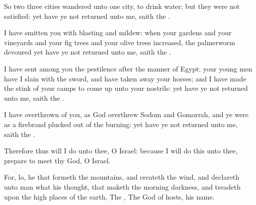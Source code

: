 {So
two
{}
three
cities
wandered unto
one
city, to
drink
water; but they were not
satisfied: yet have ye not
returned unto me,
saith the
{}.

I have
smitten you with
blasting and
mildew: when your
gardens and your
vineyards and your fig
trees and your olive
trees
increased, the
palmerworm
devoured
{} yet have ye not
returned unto me,
saith the
{}.

I have
sent among you the
pestilence after the
manner of
Egypt: your young
men have I
slain with the
sword, and have taken
away your
horses; and I have made the
stink of your
camps to come
up unto your
nostrils: yet have ye not
returned unto me,
saith the
{}.

I have
overthrown
{} of you, as
God
overthrew
Sodom and
Gomorrah, and ye were as a
firebrand plucked
out of the
burning: yet have ye not
returned unto me,
saith the
{}.

Therefore thus will I
do unto thee, O
Israel:
{}
because I will
do this unto thee,
prepare to
meet thy
God, O
Israel.

For, lo, he that
formeth the
mountains, and
createth the
wind, and
declareth unto
man what
{} his
thought, that
maketh the
morning
darkness, and
treadeth upon the high
places of the
earth, The
{}, The
God of
hosts,
{} his
name.




\par }
